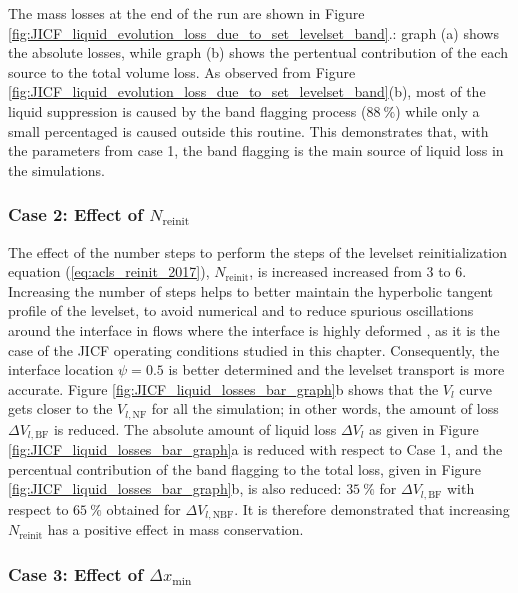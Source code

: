 The mass losses at the end of the run are shown in Figure \ref{fig:JICF_liquid_evolution_loss_due_to_set_levelset_band}.: graph (a) shows the absolute losses, while graph (b) shows the pertentual contribution of the each source to the total volume loss. As observed from Figure \ref{fig:JICF_liquid_evolution_loss_due_to_set_levelset_band}(b), most of the liquid suppression is caused by the band flagging process ($88~\%$) while only a small percentaged is caused outside this routine. This demonstrates that, with the parameters from case 1, the band flagging is the main source of liquid loss in the simulations.

\subsubsection*{Case 2: Effect of $N_\mathrm{reinit}$}



The effect of the number steps to perform the steps of the levelset reinitialization equation (\ref{eq:acls_reinit_2017}), $N_\mathrm{reinit}$, is increased increased from 3 to 6. Increasing the number of steps helps to better maintain the hyperbolic tangent profile of the levelset, to avoid numerical and to reduce spurious oscillations around the interface in flows where the interface is highly deformed , as it is the case of the JICF operating conditions studied in this chapter. Consequently, the interface location $\psi = 0.5$ is better determined and the levelset transport is more accurate. Figure \ref{fig:JICF_liquid_losses_bar_graph}b shows that the $V_l$ curve gets closer to the $V_{l,\mathrm{NF}}$ for all the simulation; in other words, the amount of loss $\Delta V_{l,\mathrm{BF}}$ is reduced. The absolute amount of liquid loss $\Delta V_l$ as given in Figure \ref{fig:JICF_liquid_losses_bar_graph}a is reduced with respect to Case 1, and the percentual contribution of the band flagging to the total loss, given in Figure \ref{fig:JICF_liquid_losses_bar_graph}b, is also reduced: $35~\%$ for $\Delta V_{l,\mathrm{BF}}$ with respect to $65~\%$ obtained for $\Delta V_{l,\mathrm{NBF}}$. It is therefore demonstrated that increasing $N_\mathrm{reinit}$ has a positive effect in mass conservation.


\subsubsection*{Case 3: Effect of $\Delta x_\mathrm{min}$}

